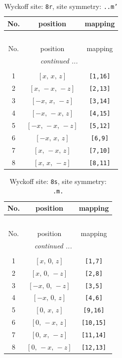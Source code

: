 \documentclass[fleqn,8pt]{jsarticle}
\begin{document}
\begin{longtable}{ccc}
\caption{Wyckoff site: {\tt 8r}, site symmetry: {\tt ..m'}}
 \\
 \hline \hline
No. & position & mapping \\ \hline \endfirsthead

\multicolumn{2}{l}{\tablename\ \thetable{}} \\
 \hline \hline
No. & position & mapping \\ \hline \endhead

 \hline \hline
\multicolumn{2}{r}{\footnotesize\it continued ...} \\ \endfoot

 \hline \hline
\multicolumn{2}{r}{} \\ \endlastfoot

1 & $\left[ x,\, x,\, z \right]$ & {\tt [1,16]} \\ \hline
2 & $\left[ x,\, - x,\, - z \right]$ & {\tt [2,13]} \\ \hline
3 & $\left[ - x,\, x,\, - z \right]$ & {\tt [3,14]} \\ \hline
4 & $\left[ - x,\, - x,\, z \right]$ & {\tt [4,15]} \\ \hline
5 & $\left[ - x,\, - x,\, - z \right]$ & {\tt [5,12]} \\ \hline
6 & $\left[ - x,\, x,\, z \right]$ & {\tt [6,9]} \\ \hline
7 & $\left[ x,\, - x,\, z \right]$ & {\tt [7,10]} \\ \hline
8 & $\left[ x,\, x,\, - z \right]$ & {\tt [8,11]} \\
\end{longtable}
\renewcommand{\arraystretch}{1.2}
\begin{longtable}{ccc}
\caption{Wyckoff site: {\tt 8s}, site symmetry: {\tt .m.}}
 \\
 \hline \hline
No. & position & mapping \\ \hline \endfirsthead

\multicolumn{2}{l}{\tablename\ \thetable{}} \\
 \hline \hline
No. & position & mapping \\ \hline \endhead

 \hline \hline
\multicolumn{2}{r}{\footnotesize\it continued ...} \\ \endfoot

 \hline \hline
\multicolumn{2}{r}{} \\ \endlastfoot

1 & $\left[ x,\, 0,\, z \right]$ & {\tt [1,7]} \\ \hline
2 & $\left[ x,\, 0,\, - z \right]$ & {\tt [2,8]} \\ \hline
3 & $\left[ - x,\, 0,\, - z \right]$ & {\tt [3,5]} \\ \hline
4 & $\left[ - x,\, 0,\, z \right]$ & {\tt [4,6]} \\ \hline
5 & $\left[ 0,\, x,\, z \right]$ & {\tt [9,16]} \\ \hline
6 & $\left[ 0,\, - x,\, z \right]$ & {\tt [10,15]} \\ \hline
7 & $\left[ 0,\, x,\, - z \right]$ & {\tt [11,14]} \\ \hline
8 & $\left[ 0,\, - x,\, - z \right]$ & {\tt [12,13]} \\
\end{longtable}
\end{document}
